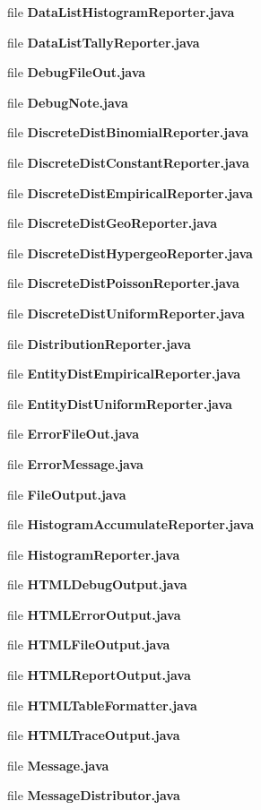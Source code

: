 \begin{DoxyCompactItemize}
\item 
file {\bfseries Data\-List\-Histogram\-Reporter.\-java}
\item 
file {\bfseries Data\-List\-Tally\-Reporter.\-java}
\item 
file {\bfseries Debug\-File\-Out.\-java}
\item 
file {\bfseries Debug\-Note.\-java}
\item 
file {\bfseries Discrete\-Dist\-Binomial\-Reporter.\-java}
\item 
file {\bfseries Discrete\-Dist\-Constant\-Reporter.\-java}
\item 
file {\bfseries Discrete\-Dist\-Empirical\-Reporter.\-java}
\item 
file {\bfseries Discrete\-Dist\-Geo\-Reporter.\-java}
\item 
file {\bfseries Discrete\-Dist\-Hypergeo\-Reporter.\-java}
\item 
file {\bfseries Discrete\-Dist\-Poisson\-Reporter.\-java}
\item 
file {\bfseries Discrete\-Dist\-Uniform\-Reporter.\-java}
\item 
file {\bfseries Distribution\-Reporter.\-java}
\item 
file {\bfseries Entity\-Dist\-Empirical\-Reporter.\-java}
\item 
file {\bfseries Entity\-Dist\-Uniform\-Reporter.\-java}
\item 
file {\bfseries Error\-File\-Out.\-java}
\item 
file {\bfseries Error\-Message.\-java}
\item 
file {\bfseries File\-Output.\-java}
\item 
file {\bfseries Histogram\-Accumulate\-Reporter.\-java}
\item 
file {\bfseries Histogram\-Reporter.\-java}
\item 
file {\bfseries H\-T\-M\-L\-Debug\-Output.\-java}
\item 
file {\bfseries H\-T\-M\-L\-Error\-Output.\-java}
\item 
file {\bfseries H\-T\-M\-L\-File\-Output.\-java}
\item 
file {\bfseries H\-T\-M\-L\-Report\-Output.\-java}
\item 
file {\bfseries H\-T\-M\-L\-Table\-Formatter.\-java}
\item 
file {\bfseries H\-T\-M\-L\-Trace\-Output.\-java}
\item 
file {\bfseries Message.\-java}
\item 
file {\bfseries Message\-Distributor.\-java}

\end{DoxyCompactItemize}
